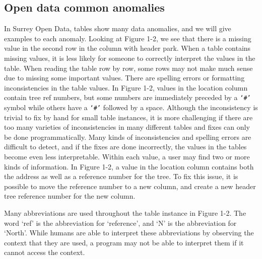 \subsection{Open data common anomalies}
In Surrey Open Data, tables show many data anomalies, and we will give examples to each anomaly. Looking at Figure 1-2, we see that there is a missing value in the second row in the column with header park. When a table contains missing values, it is less likely for someone to correctly interpret the values in the table. When reading the table row by row, some rows may not make much sense due to missing some important values.
There are spelling errors or formatting inconsistencies in the table values. In Figure 1-2, values in the location column contain tree ref numbers, but some numbers are immediately preceded by a \verb+‘#’+ symbol while others have a \verb+‘#’+ followed by a space. Although the inconsistency is trivial to fix by hand for small table instances, it is more challenging if there are too many varieties of inconsistencies in many different tables and fixes can only be done programmatically. Many kinds of inconsistencies and spelling errors are difficult to detect, and if the fixes are done incorrectly, the values in the tables become even less interpretable.
Within each value, a user may find two or more kinds of information. In Figure 1-2, a value in the location column contains both the address as well as a reference number for the tree. To fix this issue, it is possible to move the reference number to a new column, and create a new header tree reference number for the new column.

Many abbreviations are used throughout the table instance in Figure 1-2. The word ‘ref’ is the abbreviation for ‘reference’, and ‘N’ is the abbreviation for ‘North’. While humans are able to interpret these abbreviations by observing the context that they are used, a program may not be able to interpret them if it cannot access the context.

